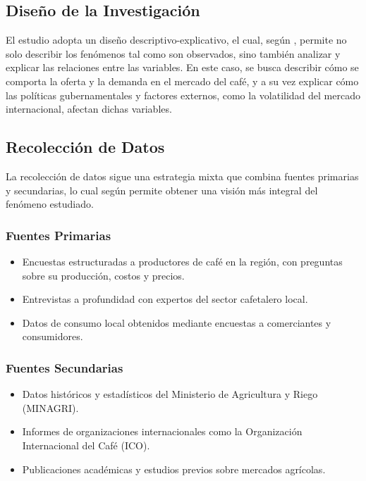 \documentclass[12pt, a4paper]{article}
\begin{document}
\subsection{Diseño de la Investigación}

El estudio adopta un diseño descriptivo-explicativo, el cual, según \cite{hernandez2014}, permite no solo describir los fenómenos tal como son observados, sino también analizar y explicar las relaciones entre las variables. En este caso, se busca describir cómo se comporta la oferta y la demanda en el mercado del café, y a su vez explicar cómo las políticas gubernamentales y factores externos, como la volatilidad del mercado internacional, afectan dichas variables.

\subsection{Recolección de Datos}

La recolección de datos sigue una estrategia mixta que combina fuentes primarias y secundarias, lo cual según \cite{yin2017} permite obtener una visión más integral del fenómeno estudiado.

\subsubsection{Fuentes Primarias}
\begin{itemize}
    \item Encuestas estructuradas a productores de café en la región, con preguntas sobre su producción, costos y precios.
    \item Entrevistas a profundidad con expertos del sector cafetalero local.
    \item Datos de consumo local obtenidos mediante encuestas a comerciantes y consumidores.
\end{itemize}

\subsubsection{Fuentes Secundarias}
\begin{itemize}
    \item Datos históricos y estadísticos del Ministerio de Agricultura y Riego (MINAGRI).
    \item Informes de organizaciones internacionales como la Organización Internacional del Café (ICO).
    \item Publicaciones académicas y estudios previos sobre mercados agrícolas.
\end{itemize}
\end{document}

